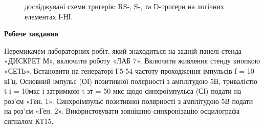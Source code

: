 \documentclass[a4paper,14pt]{extreport}
\begin{document}
\begin{figure}[h]
	\caption{досліджувані схеми тригерів: RS-, S-, та D-тригери на логічних
елементах І-НІ.}
	\label{ris1}
\end{figure}


\begin{center}
\textbf{Робоче завдання}
\end{center}
Перемикачем лабораторних робіт, який знаходиться на задній панелі
стенда «ДИСКРЕТ М», включити роботу «ЛАБ 7».
Включити живлення стенду кнопкою «СЕТЬ».
Встановити на генераторі Г5-54 частоту проходження імпульсів f = 10
кГц. Основний імпульс (ОІ) позитивної полярності з амплітудою 5В,
тривалістю t і = 10мкс і затримкою t зт = 50 мкс щодо синхроімпульса (СІ) подати
на роз'єм «Ген. 1». Синхроімпульс позитивної полярності з амплітудою 5В
подати на роз'єм «Ген. 2». Використовувати зовнішню синхронізацію
осцилографа сигналом КТ15.
\end{document}
